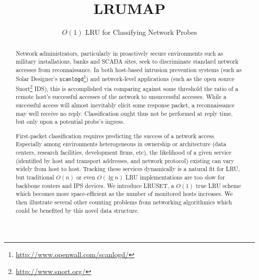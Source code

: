 \documentclass[10pt]{sigplanconf}
\begin{document}

\title{LRUMAP}
\subtitle{$O(1)$ LRU for Classifying Network Probes}

\maketitle
\begin{abstract}
Network administrators, particularly in proactively secure environments such
as military installations, banks and SCADA sites, seek to discriminate standard
network accesses from reconnaissance. In both host-based intrusion prevention
systems (such as Solar Designer's \texttt{scanlogd}\footnote{\url{http://www.openwall.com/scanlogd/}})
and network-level applications (such as the open source Snort\footnote{\url{http://www.snort.org/}} IDS),
this is accomplished via comparing against some threshold the ratio of a remote
host's successful accesses of the network to unsuccessful accesses. While a
successful access will almost inevitably elicit some response packet, a
reconnaissance may well receive no reply. Classification ought thus not be performed
at reply time, but only upon a potential probe's ingress.

First-packet classification requires predicting the success of a network access.
Especially among environments heterogeneous in ownership or architecture (data centers, research facilities,
development firms, etc), the likelihood of a given service (identified by host
and transport addresses, and network protocol) existing can vary widely from
host to host. Tracking these services dynamically is a natural fit for LRU, but
traditional $O(n)$ or even $O(\lg{n})$ LRU implementations are too slow for
backbone routers and IPS devices. We introduce LRUSET, a $O(1)$ true LRU scheme
which becomes more space-efficient as the number of monitored hosts increases.
We then illustrate several other counting problems from networking algorithmics
which could be benefited by this novel data structure.
\end{abstract}



\end{document}
